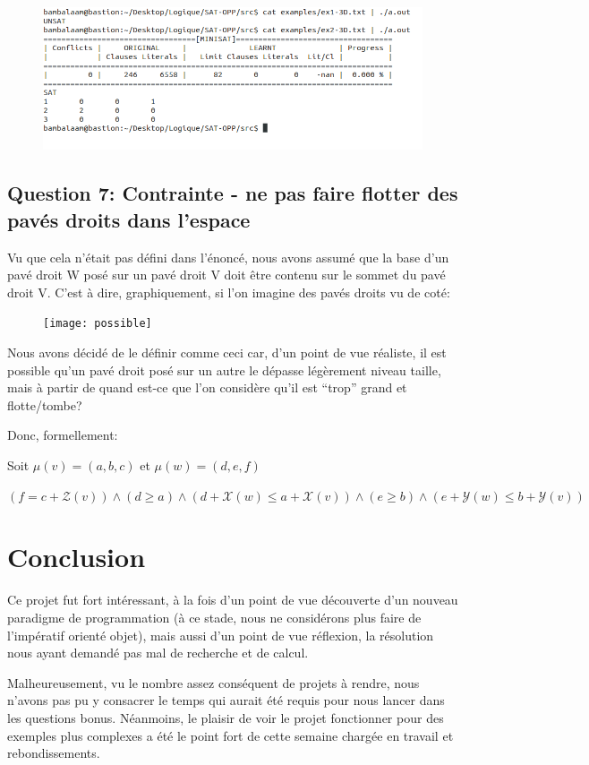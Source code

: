 \documentclass[a4paper,10pt]{article}
\begin{document}
\begin{figure}[htb!]
\centering
\includegraphics[scale=0.50]{SAT-3D}
\end{figure}

\subsection{Question 7: Contrainte - ne pas faire flotter des pavés droits dans l'espace}

Vu que cela n'était pas défini dans l'énoncé, nous avons assumé que la base d'un pavé droit W posé sur un pavé droit V doit être contenu sur le sommet du pavé droit V. C'est à dire, graphiquement, si l'on imagine des pavés droits vu de coté:

\begin{figure}[htb!]
\centering
\texttt{[image: possible]}
\end{figure}

Nous avons décidé de le définir comme ceci car, d'un point de vue réaliste, il est possible qu'un pavé droit posé sur un autre le dépasse légèrement niveau taille, mais à partir de quand est-ce que l'on considère qu'il est ``trop'' grand et flotte/tombe?

Donc, formellement:

Soit $\mu(v) = (a,b,c)$ et $\mu(w) = (d,e,f)$

$(f = c + \mathcal{Z}(v)) \land (d \geq a) \land (d+\mathcal{X}(w) \leq a+\mathcal{X}(v)) \land (e \geq b) \land(e+\mathcal{Y}(w) \leq b+\mathcal{Y}(v))$

\section{Conclusion}

Ce projet fut fort intéressant, à la fois d'un point de vue découverte d'un nouveau paradigme de programmation (à ce stade, nous ne considérons plus faire de l'impératif orienté objet), mais aussi d'un point de vue réflexion, la résolution nous ayant demandé pas mal de recherche et de calcul.

Malheureusement, vu le nombre assez conséquent de projets à rendre, nous n'avons pas pu y consacrer le temps qui aurait été requis pour nous lancer dans les questions bonus. Néanmoins, le plaisir de voir le projet fonctionner pour des exemples plus complexes a été le point fort de cette semaine chargée en travail et rebondissements.
\end{document}
